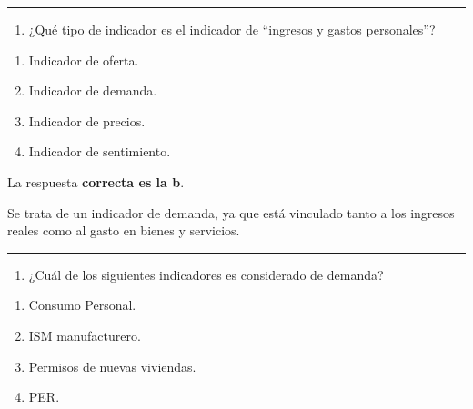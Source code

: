 \documentclass[
  letterpaper,
  DIV=11,
  numbers=noendperiod]{scrreprt}
\providecommand{\tightlist}{%
  \setlength{\itemsep}{0pt}\setlength{\parskip}{0pt}}\usepackage{longtable,booktabs,array}
\begin{document}
\begin{center}\rule{0.5\linewidth}{0.5pt}\end{center}

\begin{enumerate}
\def\labelenumi{\arabic{enumi}.}
\setcounter{enumi}{26}
\tightlist
\item
  ¿Qué tipo de indicador es el indicador de ``ingresos y gastos
  personales''?
\end{enumerate}

\begin{enumerate}
\def\labelenumi{\alph{enumi})}
\item
  Indicador de oferta.
\item
  Indicador de demanda.
\item
  Indicador de precios.
\item
  Indicador de sentimiento.
\end{enumerate}

\begin{tcolorbox}[enhanced jigsaw, left=2mm, opacityback=0, colback=white, breakable, arc=.35mm, bottomrule=.15mm, rightrule=.15mm, toprule=.15mm, leftrule=.75mm, colframe=quarto-callout-tip-color-frame]
\begin{minipage}[t]{5.5mm}
\textcolor{quarto-callout-tip-color}{\faLightbulb}
\end{minipage}%
\begin{minipage}[t]{\textwidth - 5.5mm}

La respuesta \textbf{correcta es la b}.

Se trata de un indicador de demanda, ya que está vinculado tanto a los
ingresos reales como al gasto en bienes y servicios.

\end{minipage}%
\end{tcolorbox}

\begin{center}\rule{0.5\linewidth}{0.5pt}\end{center}

\begin{enumerate}
\def\labelenumi{\arabic{enumi}.}
\setcounter{enumi}{27}
\tightlist
\item
  ¿Cuál de los siguientes indicadores es considerado de demanda?
\end{enumerate}

\begin{enumerate}
\def\labelenumi{\alph{enumi})}
\item
  Consumo Personal.
\item
  ISM manufacturero.
\item
  Permisos de nuevas viviendas.
\item
  PER.
\end{enumerate}
\end{document}
